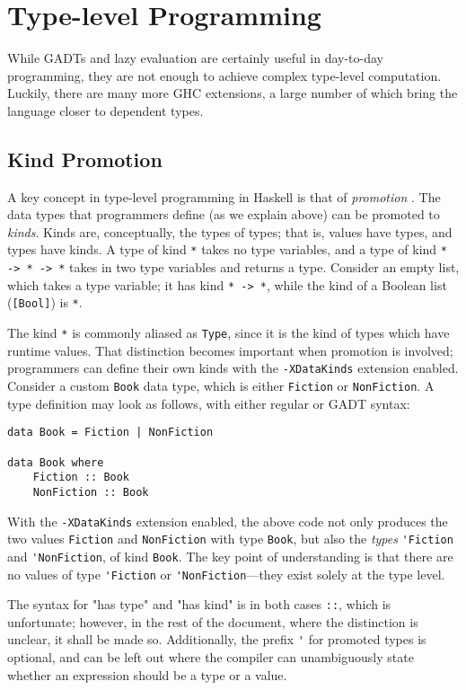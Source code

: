 \documentclass[12pt, a4paper, bibliography=totocnumbered]{scrreprt}
\newcommand{\inline}[1]{\lstinline[basicstyle=\ttfamily\footnotesize]{#1}}
\begin{document}
\section{Type-level Programming}

While GADTs and lazy evaluation are certainly useful in day-to-day programming, they are not enough to achieve complex type-level computation. Luckily, there are many more GHC extensions, a large number of which bring the language closer to dependent types.

\subsection{Kind Promotion}

A key concept in type-level programming in Haskell is that of \emph{promotion} \cite{givingpromotion}. The data types that programmers define (as we explain above) can be promoted to \emph{kinds}. Kinds are, conceptually, the types of types; that is, values have types, and types have kinds. A type of kind \inline{*} takes no type variables, and a type of kind \inline{* -> * -> *} takes in two type variables and returns a type. Consider an empty list, which takes a type variable; it has kind \inline{* -> *}, while the kind of a Boolean list (\inline{[Bool]}) is \inline{*}.

The kind \inline{*} is commonly aliased as \inline{Type}, since it is the kind of types which have runtime values. That distinction becomes important when promotion is involved; programmers can define their own kinds with the \inline{-XDataKinds} extension enabled. Consider a custom \inline{Book} data type, which is either \inline{Fiction} or \inline{NonFiction}. A type definition may look as follows, with either regular or GADT syntax:

\begin{lstlisting}
data Book = Fiction | NonFiction

data Book where
    Fiction :: Book
    NonFiction :: Book
\end{lstlisting}

With the \inline{-XDataKinds} extension enabled, the above code not only produces the two values \inline{Fiction} and \inline{NonFiction} with type \inline{Book}, but also the \emph{types} \inline{'Fiction} and \inline{'NonFiction}, of kind \inline{Book}. The key point of understanding is that there are no values of type \inline{'Fiction} or \inline{'NonFiction}---they exist solely at the type level.

The syntax for "has type" and "has kind" is in both cases \inline{::}, which is unfortunate; however, in the rest of the document, where the distinction is unclear, it shall be made so. Additionally, the prefix \inline{'} for promoted types is optional, and can be left out where the compiler can unambiguously state whether an expression should be a type or a value.
\end{document}

